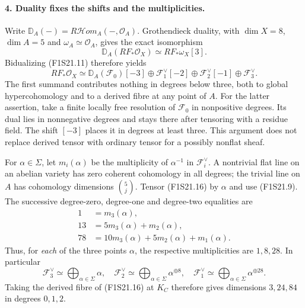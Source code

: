 \paragraph{4. Duality fixes the shifts and the multiplicities.}
Write $\mathbb D_A(-)=R\mathcal Hom_A(-,\mathcal O_A)$.
Grothendieck duality, with $\dim X=8$, $\dim A=5$ and
$\omega_A\simeq\mathcal O_A$, gives the exact isomorphism
\[
 \mathbb D_A(RF_*\mathcal O_X)\simeq RF_*\omega_X[3].
 \tag{F1S21.15}
\]
Bidualizing (F1S21.11) therefore yields
\[
 RF_*\mathcal O_X\simeq
 \mathbb D_A(\mathcal F_0)[-3]
 \oplus\mathcal F_1^\vee[-2]
 \oplus\mathcal F_2^\vee[-1]
 \oplus\mathcal F_3^\vee.
 \tag{F1S21.16}
\]
The first summand contributes nothing in degrees below
three, both to global hypercohomology and to a derived
fibre at any point of $A$. For the latter assertion,
take a finite locally free resolution of $\mathcal F_0$
in nonpositive degrees. Its dual lies in nonnegative
degrees and stays there after tensoring with a residue
field. The shift $[-3]$ places it in degrees at least
three. This argument does not replace derived tensor
with ordinary tensor for a possibly nonflat sheaf.

For $\alpha\in\Sigma$, let $m_i(\alpha)$ be the multiplicity
of $\alpha^{-1}$ in $\mathcal F_i^\vee$. A nontrivial flat
line on an abelian variety has zero coherent cohomology
in all degrees; the trivial line on $A$ has cohomology
dimensions $\binom5j$. Tensor (F1S21.16) by $\alpha$ and
use (F1S21.9). The successive degree-zero, degree-one and
degree-two equalities are
\[
 \begin{split}
 1&=m_3(\alpha),\\
 13&=5m_3(\alpha)+m_2(\alpha),\\
 78&=10m_3(\alpha)+5m_2(\alpha)+m_1(\alpha).
 \end{split}
 \tag{F1S21.17}
\]
Thus, for \emph{each} of the three points $\alpha$,
the respective multiplicities are $1,8,28$. In particular
\[
 \mathcal F_3^\vee\simeq\bigoplus_{\alpha\in\Sigma}\alpha,
 \quad
 \mathcal F_2^\vee\simeq\bigoplus_{\alpha\in\Sigma}\alpha^{\oplus8},
 \quad
 \mathcal F_1^\vee\simeq\bigoplus_{\alpha\in\Sigma}\alpha^{\oplus28}.
 \tag{F1S21.18}
\]
Taking the derived fibre of (F1S21.16) at $K_C$ therefore
gives dimensions $3,24,84$ in degrees $0,1,2$.

